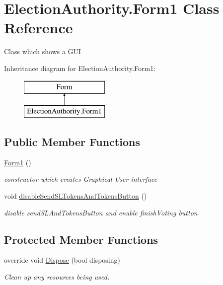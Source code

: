 \hypertarget{class_election_authority_1_1_form1}{}\section{Election\+Authority.\+Form1 Class Reference}
\label{class_election_authority_1_1_form1}


Class which shows a G\+U\+I  


Inheritance diagram for Election\+Authority.\+Form1\+:\begin{figure}[H]
\begin{center}
\leavevmode
\includegraphics[height=2.000000cm]{class_election_authority_1_1_form1}
\end{center}
\end{figure}
\subsection*{Public Member Functions}
\begin{DoxyCompactItemize}
\item 
\hyperlink{class_election_authority_1_1_form1_a412d29d9ec02280ec1e7754ea34ab247}{Form1} ()
\begin{DoxyCompactList}\small\item\em constructor which creates Graphical User interface \end{DoxyCompactList}\item 
void \hyperlink{class_election_authority_1_1_form1_a82f9df8410a98e09ead89954fad7ebf1}{disable\+Send\+S\+L\+Tokens\+And\+Tokens\+Button} ()
\begin{DoxyCompactList}\small\item\em disable send\+S\+L\+And\+Tokens\+Button and enable finish\+Voting button \end{DoxyCompactList}\end{DoxyCompactItemize}
\subsection*{Protected Member Functions}
\begin{DoxyCompactItemize}
\item 
override void \hyperlink{class_election_authority_1_1_form1_a07a43432d6f1f2fab732f8f8db1aa3d3}{Dispose} (bool disposing)
\begin{DoxyCompactList}\small\item\em Clean up any resources being used. \end{DoxyCompactList}\end{DoxyCompactItemize}


